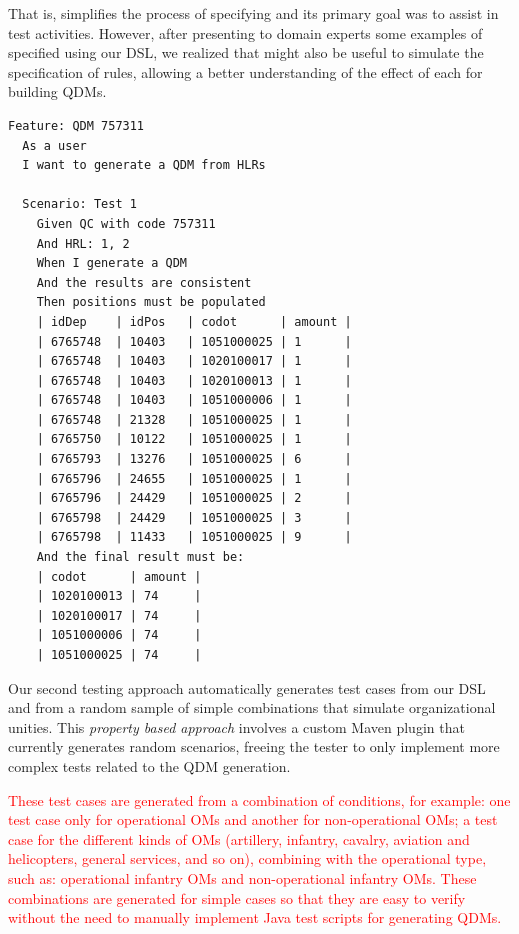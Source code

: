 {\color{red}That is, \hlrdsl simplifies the process of specifying \callers and its primary goal was to assist in
test activities. However, after presenting to domain experts some examples of \callers specified using our DSL,
we realized that \hlrdsl might also be useful to simulate the specification of rules,
allowing a better understanding of the effect of each \shc for building QDMs.}

\begin{lstlisting}[frame=single, language=Cucumber, caption={\it Cucumber feature}, label={code:cucumber}]
Feature: QDM 757311
  As a user
  I want to generate a QDM from HLRs

  Scenario: Test 1
    Given QC with code 757311
    And HRL: 1, 2
    When I generate a QDM
    And the results are consistent
    Then positions must be populated
    | idDep    | idPos   | codot      | amount |
    | 6765748  | 10403   | 1051000025 | 1      |
    | 6765748  | 10403   | 1020100017 | 1      |
    | 6765748  | 10403   | 1020100013 | 1      |
    | 6765748  | 10403   | 1051000006 | 1      |
    | 6765748  | 21328   | 1051000025 | 1      |
    | 6765750  | 10122   | 1051000025 | 1      |    
    | 6765793  | 13276   | 1051000025 | 6      |
    | 6765796  | 24655   | 1051000025 | 1      |
    | 6765796  | 24429   | 1051000025 | 2      |
    | 6765798  | 24429   | 1051000025 | 3      |
    | 6765798  | 11433   | 1051000025 | 9      |   
    And the final result must be:
    | codot      | amount |
    | 1020100013 | 74     |
    | 1020100017 | 74     |
    | 1051000006 | 74     |
    | 1051000025 | 74     |
\end{lstlisting}

Our second testing approach automatically generates test cases from our DSL and from a random sample of simple combinations that simulate organizational unities. This \emph{property based approach} involves a custom Maven plugin that currently generates random scenarios, freeing the tester to only implement more complex tests related to the QDM generation. 

\textcolor{red}{These test cases are generated from a combination of conditions, for example: one test case only for operational OMs and another for non-operational OMs; a test case for the different kinds of OMs (artillery, infantry, cavalry, aviation and helicopters, general services, and so on), combining with the operational type, such as: operational infantry OMs and non-operational infantry OMs. These combinations are generated for simple cases so that they are easy to verify without the need to manually implement Java test scripts for generating QDMs.}

